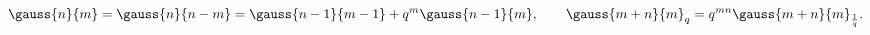 \begin{equation}
\gauss{n}{m}=\gauss{n}{n-m}=\gauss{n-1}{m-1}+q^m\gauss{n-1}{m},\qquad
\gauss{m+n}{m}_q=q^{mn}\gauss{m+n}{m}_{1\over q}.\label{qbinprops}
\end{equation}

